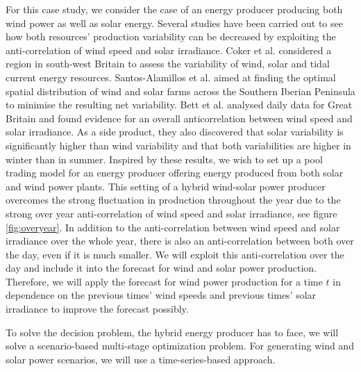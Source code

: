For this case study, we consider the case of an energy producer producing both wind power as well as solar energy. Several studies have been carried out to see how both resources' production variability  can be decreased by exploiting the anti-correlation of wind speed and solar irradiance. Coker et al. \cite{Coker2013} considered a region in south-west Britain to assess the variability of wind, solar and tidal current energy resources. Santos-Alamillos et al. \cite{Santos-Alamillos} aimed at finding the optimal spatial distribution of wind and solar farms across the Southern Iberian Peninsula to minimise the resulting net variability. Bett et al. \cite{BETT16} analysed daily data for Great Britain and found  evidence for an overall anticorrelation between wind speed and solar irradiance. As a side product, they also discovered that solar variability is significantly higher than wind variability and that both variabilities are higher in winter than in summer. Inspired by these results, we wish to set up a pool trading model for an energy producer offering energy produced from both solar and wind power plants.  
This setting of a hybrid wind-solar power producer
	overcomes the strong fluctuation in production throughout the year due to the strong over year anti-correlation of wind speed and solar irradiance, see figure \ref{fig:overyear}. In addition to
	the anti-correlation between wind speed and solar irradiance over the whole year, there is also an anti-correlation between both over the day, even if it is much smaller. We will exploit this anti-correlation over the day and include it into the forecast
	for wind and solar power production. Therefore, we will apply the forecast for wind power production for a time $t$ in dependence on the previous times' wind speeds and previous times' solar irradiance to improve the forecast possibly. 
	
	To solve the  decision problem, the hybrid energy producer has to face, we will solve a scenario-based multi-stage optimization problem. For generating wind and solar power scenarios, we will use a time-series-based approach.  

